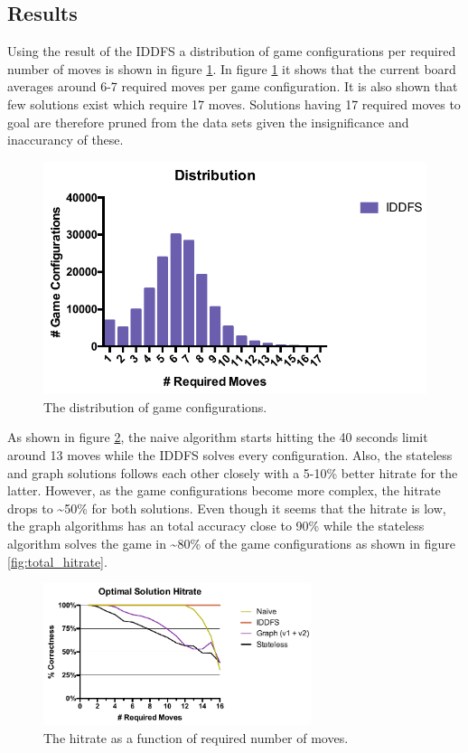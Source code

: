 \documentclass[]{article}
\begin{document}
\subsection{Results}\label{results}

Using the result of the IDDFS a distribution of game configurations per
required number of moves is shown in figure \ref{fig:dist}. In figure
\ref{fig:dist} it shows that the current board averages around 6-7
required moves per game configuration. It is also shown that few
solutions exist which require 17 moves. Solutions having 17 required
moves to goal are therefore pruned from the data sets given the
insignificance and inaccurancy of these.

\begin{figure}[ht]
\centering
\includegraphics[width=0.7\linewidth]{img/dist.pdf}
\caption{The distribution of game configurations. }
\label{fig:dist}
\end{figure}

As shown in figure \ref{fig:hitrate}, the naive algorithm starts hitting
the 40 seconds limit around 13 moves while the IDDFS solves every
configuration. Also, the stateless and graph solutions follows each
other closely with a 5-10\% better hitrate for the latter. However, as
the game configurations become more complex, the hitrate drops to
\textasciitilde{}50\% for both solutions. Even though it seems that the
hitrate is low, the graph algorithms has an total accuracy close to 90\%
while the stateless algorithm solves the game in \textasciitilde{}80\%
of the game configurations as shown in figure \ref{fig:total_hitrate}.

\begin{figure}[htb]
\centering
\includegraphics[height=0.25\textheight,width=0.7\textwidth,keepaspectratio]{img/hitrate.pdf}
\caption{The hitrate as a function of required number of moves.}
\label{fig:hitrate}
\end{figure}
\end{document}
